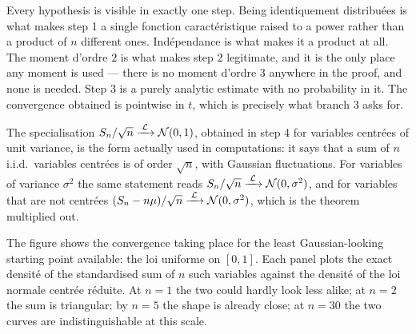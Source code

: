 \begin{remark}
  Every hypothesis is visible in exactly one step. Being identiquement
  distribuées is what makes step 1 a single fonction caractéristique raised to
  a power rather than a product of $n$ different ones. Indépendance is what
  makes it a product at all.
  The moment d'ordre $2$ is what makes step 2 legitimate, and it is the only
  place any moment is used --- there is no moment d'ordre 3 anywhere in the
  proof, and none is needed. Step 3 is a purely analytic estimate with no
  probability in it. The convergence obtained is pointwise in $t$, which is
  precisely what branch 3 asks for.
\end{remark}

\begin{remark}
  The specialisation $S_{n}/\sqrt{n} \xrightarrow{\;\mathcal{L}\;} \mathcal{N}(0,1)$, obtained in step 4
  for variables centrées of unit variance, is the form actually used in
  computations: it says that a sum of $n$ i.i.d.\ variables centrées is of order
  $\sqrt{n}$, with Gaussian fluctuations. For variables of variance
  $\sigma^{2}$ the same statement reads
  $S_{n}/\sqrt{n} \xrightarrow{\;\mathcal{L}\;} \mathcal{N}(0, \sigma^{2})$, and for variables that are
  not centrées
  $(S_{n} - n\mu)/\sqrt{n} \xrightarrow{\;\mathcal{L}\;} \mathcal{N}(0, \sigma^{2})$, which is the
  theorem multiplied out.
\end{remark}

The figure shows the convergence taking place for the least Gaussian-looking
starting point available: the loi uniforme on $[0,1]$. Each panel plots the
exact densité of the standardised sum of $n$ such variables against the
densité of the loi normale centrée réduite. At $n = 1$ the two could hardly look less alike; at $n = 2$ the
sum is triangular; by $n = 5$ the shape is already close; at $n = 30$ the two
curves are indistinguishable at this scale.

